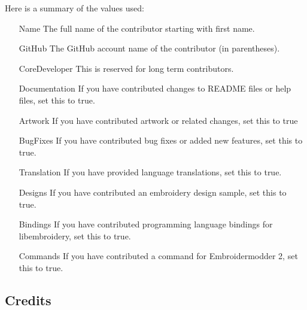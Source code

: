 \documentclass[onesize, a4paper]{refart}
\begin{document}
Here is a summary of the values used:
\begin{itemize}
\item[Name] The full name of the contributor starting with first name.
\item[GitHub] The GitHub account name of the contributor (in parentheses).
\item[CoreDeveloper] This is reserved for long term contributors.
\item[Documentation] If you have contributed changes to README files or help files, set this to true.
\item[Artwork] If you have contributed artwork or related changes, set this to true
\item[BugFixes] If you have contributed bug fixes or added new features, set this to true.
\item[Translation] If you have provided language translations, set this to true.
\item[Designs] If you have contributed an embroidery design sample, set this to true.
\item[Bindings] If you have contributed programming language bindings for libembroidery, set this to true.
\item[Commands] If you have contributed a command for Embroidermodder 2, set this to true.
\end{itemize}

\subsection{Credits}
\end{document}
